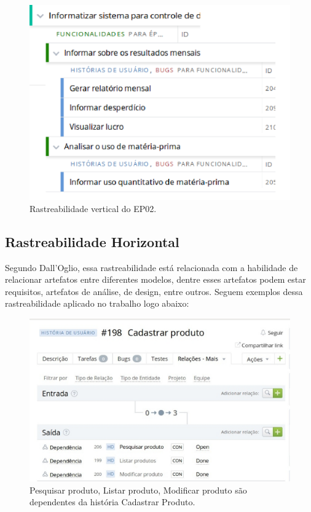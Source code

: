 \begin{figure}[!htpb]
\centering
\includegraphics[scale=0.35]{figuras/processo/epico2}
\caption{Rastreabilidade vertical do EP02.}
\end{figure}

\subsection{Rastreabilidade Horizontal}
Segundo Dall'Oglio, essa rastreabilidade está relacionada com a habilidade de relacionar artefatos entre diferentes modelos, dentre esses artefatos podem estar requisitos, artefatos de análise, de design, entre outros. Seguem exemplos dessa rastreabilidade aplicado no trabalho logo abaixo:

\begin{figure}[!htpb]
\centering
\includegraphics[scale=0.6]{figuras/gerenciamento/foto}
\caption{Pesquisar produto, Listar produto, Modificar produto são dependentes da história Cadastrar Produto.}
\end{figure}